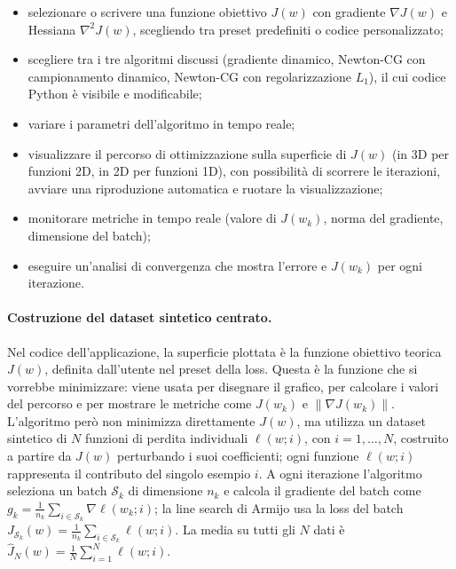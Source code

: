 \begin{itemize}
  \item selezionare o scrivere una funzione obiettivo $J(w)$ con gradiente
  $\nabla J(w)$ e Hessiana $\nabla^2 J(w)$, scegliendo tra preset predefiniti
  o codice personalizzato;
  \item scegliere tra i tre algoritmi discussi (gradiente dinamico,
  Newton-CG con campionamento dinamico, Newton-CG con regolarizzazione
  $L_1$), il cui codice Python è visibile e modificabile;
  \item variare i parametri dell'algoritmo in tempo reale;
  \item visualizzare il percorso di ottimizzazione sulla superficie di
  $J(w)$ (in 3D per funzioni 2D, in 2D per funzioni 1D), con possibilità di
  scorrere le iterazioni, avviare una riproduzione automatica e ruotare la
  visualizzazione;
  \item monitorare metriche in tempo reale (valore di $J(w_k)$, norma del
  gradiente, dimensione del batch);
  \item eseguire un'analisi di convergenza che mostra l'errore e $J(w_k)$
  per ogni iterazione.
\end{itemize}


\paragraph{Costruzione del dataset sintetico centrato.}
Nel codice dell'applicazione, la superficie plottata è la funzione obiettivo
teorica $J(w)$, definita dall'utente nel preset della loss. Questa è la
funzione che si vorrebbe minimizzare: viene usata per disegnare il grafico,
per calcolare i valori del percorso e per mostrare le metriche come $J(w_k)$
e $\|\nabla J(w_k)\|$. L'algoritmo però non minimizza direttamente $J(w)$,
ma utilizza un dataset sintetico di $N$ funzioni di perdita individuali
$\ell(w; i)$, con $i = 1,\dots,N$, costruito a partire da $J(w)$ perturbando
i suoi coefficienti; ogni funzione $\ell(w; i)$ rappresenta il contributo del
singolo esempio $i$. A ogni iterazione l'algoritmo seleziona un batch
$\mathcal{S}_k$ di dimensione $n_k$ e calcola il gradiente del batch come
$g_k = \frac{1}{n_k}\sum_{i \in \mathcal{S}_k}\nabla \ell(w_k; i)$; la line
search di Armijo usa la loss del batch
$J_{\mathcal{S}_k}(w) = \frac{1}{n_k}\sum_{i \in \mathcal{S}_k}\ell(w; i)$.
La media su tutti gli $N$ dati è
$\hat J_N(w) = \frac{1}{N}\sum_{i=1}^N \ell(w; i)$.

